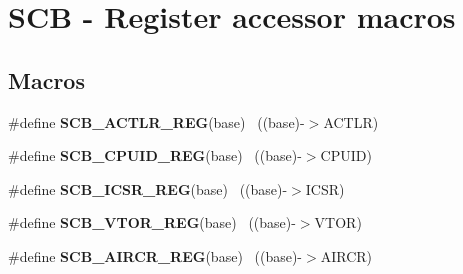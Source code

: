 \hypertarget{group___s_c_b___register___accessor___macros}{}\section{S\+C\+B -\/ Register accessor macros}
\label{group___s_c_b___register___accessor___macros}
\subsection*{Macros}
\begin{DoxyCompactItemize}
\item 
\hypertarget{group___s_c_b___register___accessor___macros_gacc7b0065f69b9a0d772af30505d9d5e8}{}\#define {\bfseries S\+C\+B\+\_\+\+A\+C\+T\+L\+R\+\_\+\+R\+E\+G}(base)                                        ~((base)-\/$>$A\+C\+T\+L\+R)\label{group___s_c_b___register___accessor___macros_gacc7b0065f69b9a0d772af30505d9d5e8}

\item 
\hypertarget{group___s_c_b___register___accessor___macros_ga0fafcf57528f45b4ef5f3c5bfa627d55}{}\#define {\bfseries S\+C\+B\+\_\+\+C\+P\+U\+I\+D\+\_\+\+R\+E\+G}(base)                                        ~((base)-\/$>$C\+P\+U\+I\+D)\label{group___s_c_b___register___accessor___macros_ga0fafcf57528f45b4ef5f3c5bfa627d55}

\item 
\hypertarget{group___s_c_b___register___accessor___macros_ga32d507fb0a9ba80ad95e451fc93c942a}{}\#define {\bfseries S\+C\+B\+\_\+\+I\+C\+S\+R\+\_\+\+R\+E\+G}(base)                                          ~((base)-\/$>$I\+C\+S\+R)\label{group___s_c_b___register___accessor___macros_ga32d507fb0a9ba80ad95e451fc93c942a}

\item 
\hypertarget{group___s_c_b___register___accessor___macros_ga882585be47587da934194ffd169da43f}{}\#define {\bfseries S\+C\+B\+\_\+\+V\+T\+O\+R\+\_\+\+R\+E\+G}(base)                                          ~((base)-\/$>$V\+T\+O\+R)\label{group___s_c_b___register___accessor___macros_ga882585be47587da934194ffd169da43f}

\item 
\hypertarget{group___s_c_b___register___accessor___macros_ga0510b76b89d5729f2ba9341356553f3e}{}\#define {\bfseries S\+C\+B\+\_\+\+A\+I\+R\+C\+R\+\_\+\+R\+E\+G}(base)                                        ~((base)-\/$>$A\+I\+R\+C\+R)\label{group___s_c_b___register___accessor___macros_ga0510b76b89d5729f2ba9341356553f3e}


\end{DoxyCompactItemize}
